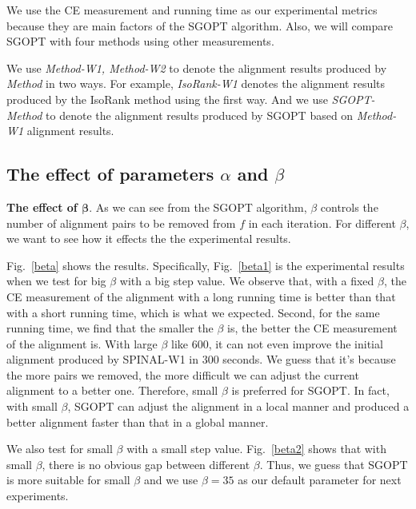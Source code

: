 \documentclass{bioinfo}
\theoremstyle{definition}
\begin{document}
We use the CE measurement and running time as our experimental metrics because they are main factors of the SGOPT algorithm. Also, we will compare SGOPT with four methods using other measurements.

We use \textit{Method-W1, Method-W2} to denote the alignment results produced by \textit{Method} in two ways. For example, \textit{IsoRank-W1} denotes the alignment results produced by the IsoRank method using the first way. And we use \textit{SGOPT-Method} to denote the alignment results produced by SGOPT based on \textit{Method-W1} alignment results.

\subsection{The effect of parameters $\alpha$ and $\beta$}
\textbf{The effect of $\mathbf{\beta}$}. As we can see from the SGOPT algorithm, $\beta$ controls the number of alignment pairs to be removed from $f$ in each iteration. For different $\beta$, we want to see how it effects the the experimental results. 

Fig.~\ref{beta} shows the results. Specifically, Fig.~\ref{beta1} is the experimental results when we test for big $\beta$ with a big step value. We observe that, with a fixed $\beta$, the CE measurement of the alignment with a long running time is better than that with a short running time, which is what we expected. Second, for the same running time, we find that the smaller the $\beta$ is, the better the CE measurement of the alignment is. With large $\beta$ like 600, it can not even improve the initial alignment produced by SPINAL-W1 in 300 seconds. We guess that it's because the more pairs we removed, the more difficult we can adjust the current alignment to a better one. Therefore, small $\beta$ is preferred for SGOPT. In fact, with small $\beta$, SGOPT can adjust the alignment in a local manner and produced a better alignment faster than that in a global manner.

We also test for small $\beta$ with a small step value. Fig.~\ref{beta2} shows that with small $\beta$, there is no obvious gap between different $\beta$. Thus, we guess that SGOPT is more suitable for small $\beta$ and we use $\beta=35$ as our default parameter for next experiments.
\end{document}
